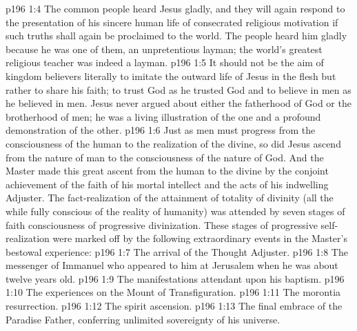 \vs p196 1:4 The common people heard Jesus gladly, and they will again respond to the presentation of his sincere human life of consecrated religious motivation if such truths shall again be proclaimed to the world. The people heard him gladly because he was one of them, an unpretentious layman; the world’s greatest religious teacher was indeed a layman.
\vs p196 1:5 It should not be the aim of kingdom believers literally to imitate the outward life of Jesus in the flesh but rather to share his faith; to trust God as he trusted God and to believe in men as he believed in men. Jesus never argued about either the fatherhood of God or the brotherhood of men; he was a living illustration of the one and a profound demonstration of the other.\plusone
\vs p196 1:6 Just as men must progress from the consciousness of the human to the realization of the divine, so did Jesus ascend from the nature of man to the consciousness of the nature of God. And the Master made this great ascent from the human to the divine by the conjoint achievement of the faith of his mortal intellect and the acts of his indwelling Adjuster. The fact\hyp{}realization of the attainment of totality of divinity (all the while fully conscious of the reality of humanity) was attended by seven stages of faith consciousness of progressive divinization. These stages of progressive self\hyp{}realization were marked off by the following extraordinary events in the Master’s bestowal experience:
\pc \vs p196 1:7 \bibnobreakspace The arrival of the Thought Adjuster.
\vs p196 1:8 \bibnobreakspace The messenger of Immanuel who appeared to him at Jerusalem when he was about twelve years old.
\vs p196 1:9 \bibnobreakspace The manifestations attendant upon his baptism.
\vs p196 1:10 \bibnobreakspace The experiences on the Mount of Transfiguration.
\vs p196 1:11 \bibnobreakspace The morontia resurrection.
\vs p196 1:12 \bibnobreakspace The spirit ascension.
\vs p196 1:13 \bibnobreakspace The final embrace of the Paradise Father, conferring unlimited sovereignty of his universe.
